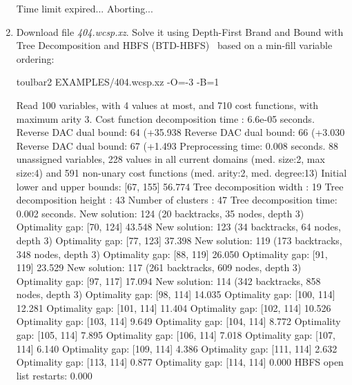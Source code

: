 \begin{enumerate}
{\begin{DoxyCode}
Time limit expired... Aborting...
\end{DoxyCode}}
\item Download file {\em 404.wcsp.xz}. Solve it using Depth-First Brand and Bound with Tree Decomposition and HBFS (BTD-HBFS)~\cite{Schiex06a} based on a min-fill variable ordering:
\begin{DoxyCode}
	toulbar2 EXAMPLES/404.wcsp.xz -O=-3 -B=1
\end{DoxyCode}
{\scriptsize
\begin{DoxyCode}
Read 100 variables, with 4 values at most, and 710 cost functions, with maximum arity 3.
Cost function decomposition time : 6.6e-05 seconds.
Reverse DAC dual bound: 64 (+35.938%
Reverse DAC dual bound: 66 (+3.030%
Reverse DAC dual bound: 67 (+1.493%
Preprocessing time: 0.008 seconds.
88 unassigned variables, 228 values in all current domains (med. size:2, max size:4) and 591 non-unary cost functions (med. arity:2, med. degree:13)
Initial lower and upper bounds: [67, 155] 56.774%
Tree decomposition width  : 19
Tree decomposition height : 43
Number of clusters        : 47
Tree decomposition time: 0.002 seconds.
New solution: 124 (20 backtracks, 35 nodes, depth 3)
Optimality gap: [70, 124] 43.548 %
New solution: 123 (34 backtracks, 64 nodes, depth 3)
Optimality gap: [77, 123] 37.398 %
New solution: 119 (173 backtracks, 348 nodes, depth 3)
Optimality gap: [88, 119] 26.050 %
Optimality gap: [91, 119] 23.529 %
New solution: 117 (261 backtracks, 609 nodes, depth 3)
Optimality gap: [97, 117] 17.094 %
New solution: 114 (342 backtracks, 858 nodes, depth 3)
Optimality gap: [98, 114] 14.035 %
Optimality gap: [100, 114] 12.281 %
Optimality gap: [101, 114] 11.404 %
Optimality gap: [102, 114] 10.526 %
Optimality gap: [103, 114] 9.649 %
Optimality gap: [104, 114] 8.772 %
Optimality gap: [105, 114] 7.895 %
Optimality gap: [106, 114] 7.018 %
Optimality gap: [107, 114] 6.140 %
Optimality gap: [109, 114] 4.386 %
Optimality gap: [111, 114] 2.632 %
Optimality gap: [113, 114] 0.877 %
Optimality gap: [114, 114] 0.000 %
HBFS open list restarts: 0.000 %

\end{DoxyCode}}
\end{enumerate}
